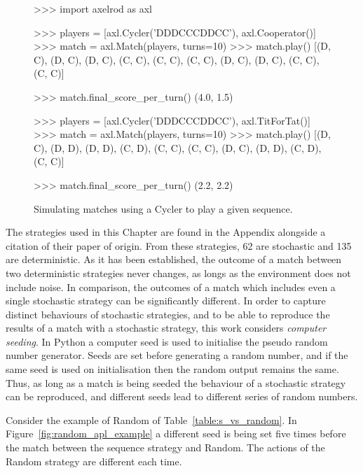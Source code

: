 \begin{figure}[!htbp]
    \begin{usagepy}
>>> import axelrod as axl

>>> players = [axl.Cycler('DDDCCCDDCC'), axl.Cooperator()]
>>> match = axl.Match(players, turns=10)
>>> match.play()
[(D, C), (D, C), (D, C), (C, C), (C, C), (C, C), (D, C), (D, C), (C, C), (C, C)]

>>> match.final_score_per_turn()
(4.0, 1.5)

>>> players = [axl.Cycler('DDDCCCDDCC'), axl.TitForTat()]
>>> match = axl.Match(players, turns=10)
>>> match.play()
[(D, C), (D, D), (D, D), (C, D), (C, C), (C, C), (D, C), (D, D), (C, D), (C, C)]

>>> match.final_score_per_turn()
(2.2, 2.2)

\end{usagepy}
\caption{Simulating matches using a Cycler to play a given sequence.}\label{fig:apl_simulations_cycler}
\end{figure}

The \numberofstrategiesbestsequences strategies used in this Chapter are found
in the Appendix alongside a citation of their paper of origin.
From these \numberofstrategiesbestsequences strategies, 62 are stochastic and
135 are deterministic. As it has been established, the outcome of a match
between two deterministic strategies never changes, as longs as the environment
does not include noise. In comparison, the outcomes of a match which includes even a single
stochastic strategy can be significantly different. In order to
capture distinct behaviours of stochastic strategies, and to be able to
reproduce the results of a match with a stochastic strategy, this work considers
\textit{computer seeding}. In Python a computer seed is used to initialise the
pseudo random number generator. Seeds are set before generating a random number,
and if the same seed is used on initialisation then the random output remains
the same. Thus, as long as a match is being seeded the behaviour of a stochastic
strategy can be reproduced, and different seeds lead to different series of
random numbers.

Consider the example of Random of Table~\ref{table:s_vs_random}. In
Figure~\ref{fig:random_apl_example} a different seed is being set five times
before the match between the sequence strategy and Random. The actions of the
Random strategy are different each time.

